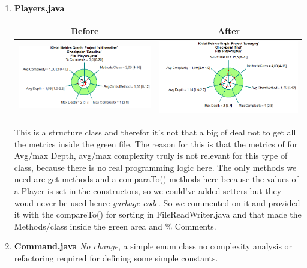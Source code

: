 \documentclass{article}
\begin{document}
\begin{enumerate}
	\item
	\textbf{Players.java\newline} %
	\begin{tabulary}{0.5\textwidth}{| c | c |}
	\hline
	Before & After \\ \hline
	\includegraphics[scale=0.4]{Playersjava-old.png} & \includegraphics[scale=0.4]{Playersjava-new.png} \\ \hline
	\end{tabulary}
	\newline
	\vspace{0.1cm}
	This is a structure class and therefor it's not that a big of deal not to get all the metrics inside the
	green file. The reason for this is that the metrics of for Avg/max Depth, avg/max complexity truly is not relevant for this type of class, because there is no real programming logic here. The only methods we need are get methods and a comparaTo() methods here because the values of a Player is set in the constructors, so we could've added setters but they woud never be used hence \textit{garbage code}. So we commented on it and provided it with the compareTo() for sorting in FileReadWriter.java and that made the Methods/class inside the green area and \% Comments. 

	\item%
	\textbf{Command.java}
	\textit{No change}, a simple enum class no complexity analysis or refactoring 
	required for defining some simple constants. 

\end{enumerate}
\end{document}
